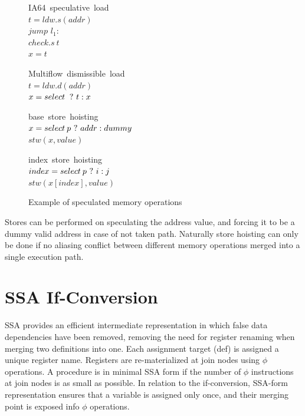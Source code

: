 \begin{figure}
\begin{minipage}[t]{4cm}
\mbox{IA64 speculative load} \\
$t = ldw.s(addr) $ \\
$jump$ $l_1:$ \\
$check.s\:t$ \\
$x = t$ \\
\end{minipage}
\begin{minipage}[t]{4cm}
\mbox{Multiflow dismissible load} \\
$t = ldw.d(addr) $ \\
$x = select\: ~?~ t : x $ \\
\end{minipage}

\begin{minipage}[t]{4cm}
\mbox{base store hoisting} \\
$x=select\:p ~?~ addr : dummy $ \\
$stw (x, value) $ \\
\end{minipage}
\begin{minipage}[t]{4cm}
\mbox{index store hoisting} \\
$index=select\:p ~?~ i : j $ \\
$stw (x[index], value) $ \\
\end{minipage}
\label{fig:spec}
\caption{Example of speculated memory operations}
\end{figure}

Stores can be performed on speculating the address value, and forcing it to be a dummy valid address in case of not taken path. Naturally store hoisting can only be done if no aliasing conflict between different memory operations merged into a single execution path.

\section{SSA If-Conversion}

SSA provides an efficient intermediate representation in which false data dependencies have been removed, removing the need for register renaming when merging two definitions into one. Each assignment target (def) is assigned a unique register name. Registers are re-materialized at join nodes using $\phi$ operations. A procedure is in minimal SSA form if the number of $\phi$ instructions at join nodes is as small as possible. In relation to the if-conversion, SSA-form representation ensures that a variable is assigned only once, and their merging point is exposed info $\phi$ operations.


